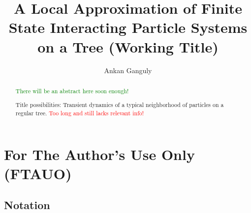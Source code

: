 \documentclass[12pt]{article}
\newcommand{\tr}{\textcolor{red}}
\newcommand{\tg}{\textcolor{green}}
\begin{document}
\title{A Local Approximation of Finite State Interacting Particle Systems on a Tree (Working Title)}
\author{Ankan Ganguly}

\maketitle

\begin{abstract}
\tg{There will be an abstract here soon enough!}

Title possibilities: Transient dynamics of a typical neighborhood of particles on a regular tree. \tr{Too long and still lacks relevant info!}
\end{abstract}

\newpage
\tableofcontents

\newpage

\section*{For The Author's Use Only (FTAUO)}
\subsection*{Notation}
\end{document}
